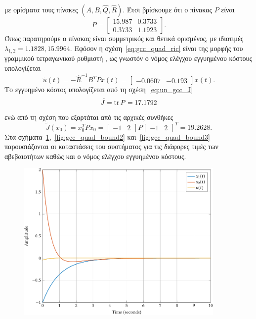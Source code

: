 με ορίσματα τους πίνακες \( (A, B, \hat{Q}, \hat{R} ) \). Έτσι βρίσκουμε ότι ο
πίνακας \( P \) είναι
\[
  P =
  \begin{bmatrix}
      15.987 & 0.3733 \\
      0.3733 & 1.1923
  \end{bmatrix}.
\]
Όπως παρατηρούμε ο πίνακας είναι συμμετρικός και θετικά ορισμένος, με ιδιοτιμές
\( \lambda_{1,2} = 1.1828, 15.9964 \). Εφόσον η σχέση~\eqref{eq:gcc_quad_ric}
είναι της μορφής του γραμμικού τετραγωνικού ρυθμιστή , ως γνωστόν ο
νόμος ελέγχου εγγυημένου κόστους υπολογίζεται
\[
    \tilde{u}(t) = - \hat{R}^{-1}B^{T}Px(t) =
    \begin{bmatrix}
        -0.0607 & -0.193
    \end{bmatrix}x(t).
\]
Το εγγυημένο κόστος υπολογίζεται από τη σχέση~\eqref{eq:un_gcc_J}
\[
   \tilde{J} = \operatorname{tr}{P} = 17.1792
\]
ενώ από τη σχέση που εξαρτάται από τις αρχικές συνθήκες
\[
    \tilde{J}(x_0) = x_0^{T}Px_0 =
    \begin{bmatrix}
        -1 & 2
    \end{bmatrix}P
    \begin{bmatrix}
        -1 & 2
    \end{bmatrix}^T = 19.2628.
\]
Στα σχήματα~\ref{fig:gcc_quad_bound1},~\ref{fig:gcc_quad_bound2}
και~\ref{fig:gcc_quad_bound3} παρουσιάζονται οι καταστάσεις του συστήματος για
τις διάφορες τιμές των αβεβαιοτήτων καθώς και ο νόμος ελέγχου εγγυημένου
κόστους.
\begin{figure}[h]
    \centering
    \includegraphics[width=0.9\textwidth]{figures/gcc_quad_bound1.pdf}
    \label{fig:gcc_quad_bound1}
\end{figure}
